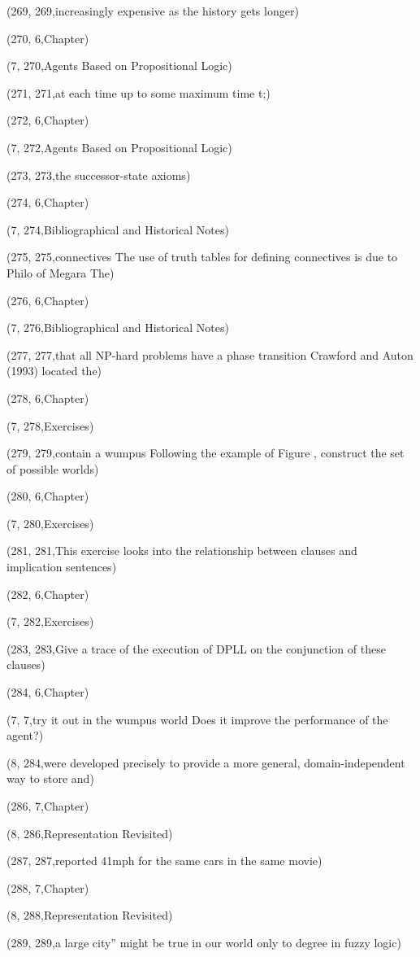 (269, 269,increasingly expensive as the history gets longer)

(270, 6,Chapter)

(7, 270,Agents Based on Propositional Logic)

(271, 271,at each time up to some maximum time t;)

(272, 6,Chapter)

(7, 272,Agents Based on Propositional Logic)

(273, 273,the successor-state axioms)

(274, 6,Chapter)

(7, 274,Bibliographical and Historical Notes)

(275, 275,connectives The use of truth tables for deﬁning connectives is due to Philo of Megara The)

(276, 6,Chapter)

(7, 276,Bibliographical and Historical Notes)

(277, 277,that all NP-hard problems have a phase transition Crawford and Auton (1993) located the)

(278, 6,Chapter)

(7, 278,Exercises)

(279, 279,contain a wumpus Following the example of Figure , construct the set of possible worlds)

(280, 6,Chapter)

(7, 280,Exercises)

(281, 281,This exercise looks into the relationship between clauses and implication sentences)

(282, 6,Chapter)

(7, 282,Exercises)

(283, 283,Give a trace of the execution of DPLL on the conjunction of these clauses)

(284, 6,Chapter)

(7, 7,try it out in the wumpus world Does it improve the performance of the agent?)

(8, 284,were developed precisely to provide a more general, domain-independent way to store and)

(286, 7,Chapter)

(8, 286,Representation Revisited)

(287, 287,reported 41mph for the same cars in the same movie)

(288, 7,Chapter)

(8, 288,Representation Revisited)

(289, 289,a large city” might be true in our world only to degree  in fuzzy logic)

